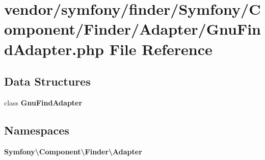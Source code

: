 \section{vendor/symfony/finder/\+Symfony/\+Component/\+Finder/\+Adapter/\+Gnu\+Find\+Adapter.php File Reference}
\label{_gnu_find_adapter_8php}
\subsection*{Data Structures}
\begin{DoxyCompactItemize}
\item 
class {\bf Gnu\+Find\+Adapter}
\end{DoxyCompactItemize}
\subsection*{Namespaces}
\begin{DoxyCompactItemize}
\item 
 {\bf Symfony\textbackslash{}\+Component\textbackslash{}\+Finder\textbackslash{}\+Adapter}
\end{DoxyCompactItemize}
